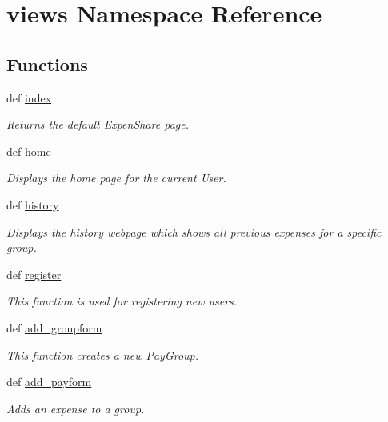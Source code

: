 \hypertarget{namespaceviews}{\section{views Namespace Reference}
\label{namespaceviews}
}
\subsection*{Functions}
\begin{DoxyCompactItemize}
\item 
def \hyperlink{namespaceviews_a4902ce68e5b3dd24deea4b61101a31a1}{index}
\begin{DoxyCompactList}\small\item\em Returns the default Expen\-Share page. \end{DoxyCompactList}\item 
def \hyperlink{namespaceviews_a7e4ef811f9b937ce756922e9eb33812f}{home}
\begin{DoxyCompactList}\small\item\em Displays the home page for the current User. \end{DoxyCompactList}\item 
def \hyperlink{namespaceviews_a17e3163834c27d86c2907512a2b97ca5}{history}
\begin{DoxyCompactList}\small\item\em Displays the history webpage which shows all previous expenses for a specific group. \end{DoxyCompactList}\item 
def \hyperlink{namespaceviews_ae6f1a0d94a661eadd45f528456e0f009}{register}
\begin{DoxyCompactList}\small\item\em This function is used for registering new users. \end{DoxyCompactList}\item 
def \hyperlink{namespaceviews_ae0bc2db6e6831d38b770b4ecc563737e}{add\-\_\-groupform}
\begin{DoxyCompactList}\small\item\em This function creates a new Pay\-Group. \end{DoxyCompactList}\item 
def \hyperlink{namespaceviews_ae9e7e1e965ecb6fb94b0305f1e353df2}{add\-\_\-payform}
\begin{DoxyCompactList}\small\item\em Adds an expense to a group. \end{DoxyCompactList}\item 

\end{DoxyCompactItemize}
